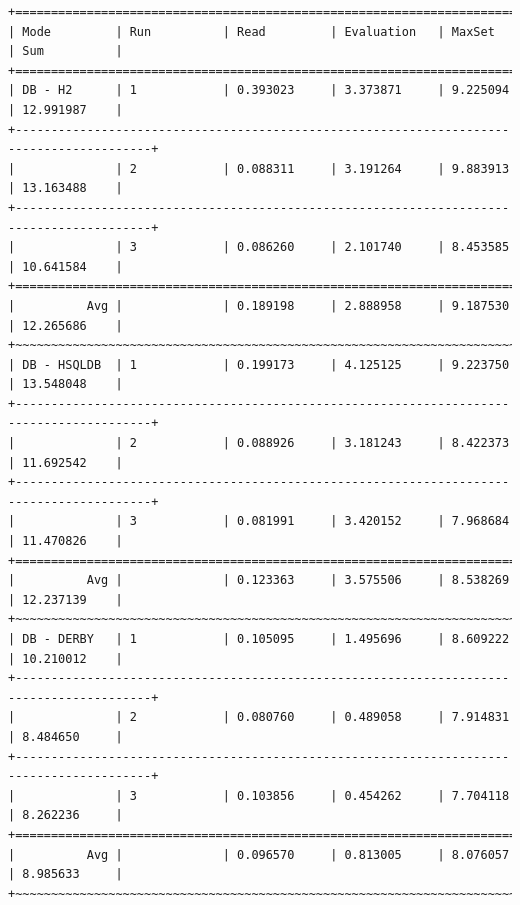 \documentclass[draft,final]{vutinfth} %
\begin{document}
\begin{lstlisting}[basicstyle=\tiny,caption={Benchmark DB \textbf{ohne} Indizes, Datei: lubm-ex-20-15.sparql.xml},label={lst:dboi15}]
+=========================================================================================+
| Mode         | Run          | Read         | Evaluation   | MaxSet       | Sum          | 
+=========================================================================================+
| DB - H2      | 1            | 0.393023     | 3.373871     | 9.225094     | 12.991987    | 
+-----------------------------------------------------------------------------------------+
|              | 2            | 0.088311     | 3.191264     | 9.883913     | 13.163488    | 
+-----------------------------------------------------------------------------------------+
|              | 3            | 0.086260     | 2.101740     | 8.453585     | 10.641584    | 
+=========================================================================================+
|          Avg |              | 0.189198     | 2.888958     | 9.187530     | 12.265686    | 
+~~~~~~~~~~~~~~~~~~~~~~~~~~~~~~~~~~~~~~~~~~~~~~~~~~~~~~~~~~~~~~~~~~~~~~~~~~~~~~~~~~~~~~~~~+
| DB - HSQLDB  | 1            | 0.199173     | 4.125125     | 9.223750     | 13.548048    | 
+-----------------------------------------------------------------------------------------+
|              | 2            | 0.088926     | 3.181243     | 8.422373     | 11.692542    | 
+-----------------------------------------------------------------------------------------+
|              | 3            | 0.081991     | 3.420152     | 7.968684     | 11.470826    | 
+=========================================================================================+
|          Avg |              | 0.123363     | 3.575506     | 8.538269     | 12.237139    | 
+~~~~~~~~~~~~~~~~~~~~~~~~~~~~~~~~~~~~~~~~~~~~~~~~~~~~~~~~~~~~~~~~~~~~~~~~~~~~~~~~~~~~~~~~~+
| DB - DERBY   | 1            | 0.105095     | 1.495696     | 8.609222     | 10.210012    | 
+-----------------------------------------------------------------------------------------+
|              | 2            | 0.080760     | 0.489058     | 7.914831     | 8.484650     | 
+-----------------------------------------------------------------------------------------+
|              | 3            | 0.103856     | 0.454262     | 7.704118     | 8.262236     | 
+=========================================================================================+
|          Avg |              | 0.096570     | 0.813005     | 8.076057     | 8.985633     | 
+~~~~~~~~~~~~~~~~~~~~~~~~~~~~~~~~~~~~~~~~~~~~~~~~~~~~~~~~~~~~~~~~~~~~~~~~~~~~~~~~~~~~~~~~~+

\end{lstlisting}
\end{document}
